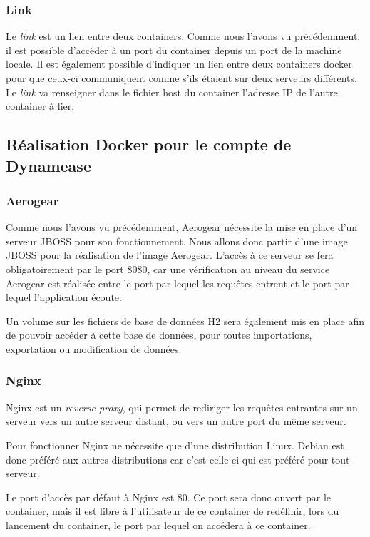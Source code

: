 \subsubsection{Link}

Le \textit{link} est un lien entre deux containers. Comme nous l'avons vu précédemment, il est possible d'accéder à un port du container depuis un port de la machine locale. Il est également possible d'indiquer un lien entre deux containers docker pour que ceux-ci communiquent comme s'ils étaient sur deux serveurs différents. Le \textit{link} va renseigner dans le fichier host du container l'adresse IP de l'autre container à lier.

\subsection{Réalisation Docker pour le compte de Dynamease}

\subsubsection{Aerogear}

Comme nous l'avons vu précédemment, Aerogear nécessite la mise en place d'un serveur JBOSS pour son fonctionnement. Nous allons donc partir d'une image JBOSS pour la réalisation de l'image Aerogear. L'accès à ce serveur se fera obligatoirement par le port 8080, car une vérification au niveau du service Aerogear est réalisée entre le port par lequel les requêtes entrent et le port par lequel l'application écoute.

Un volume sur les fichiers de base de données H2 sera également mis en place afin de pouvoir accéder à cette base de données, pour toutes importations, exportation ou modification de données.

\subsubsection{Nginx}

Nginx est un \textit{reverse proxy}, qui permet de rediriger les requêtes entrantes sur un serveur vers un autre serveur distant, ou vers un autre port du même serveur.

Pour fonctionner Nginx ne nécessite que d'une distribution Linux. Debian est donc préféré aux autres distributions car c'est celle-ci qui est préféré pour tout serveur.

Le port d'accès par défaut à Nginx est 80. Ce port sera donc ouvert par le container, mais il est libre à l'utilisateur de ce container de redéfinir, lors du lancement du container, le port par lequel on accédera à ce container.

